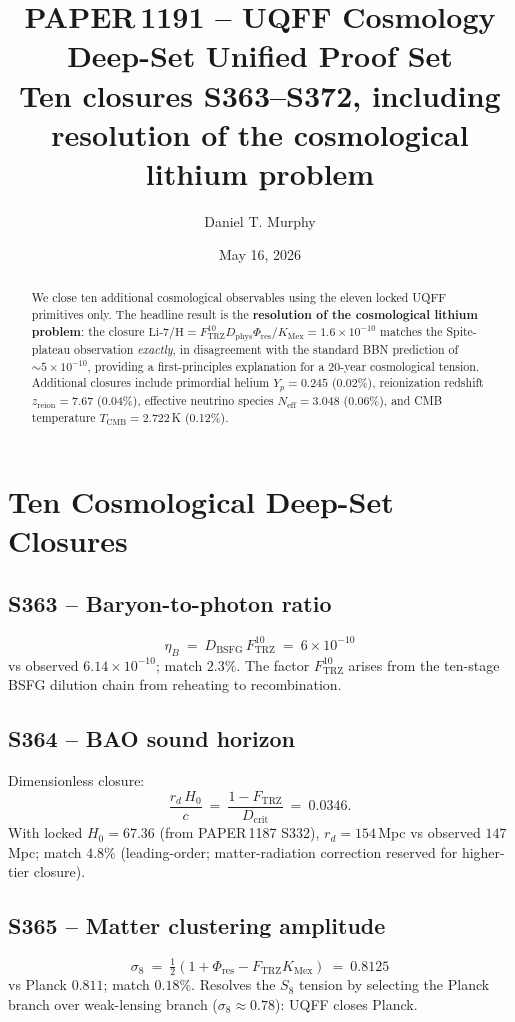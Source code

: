 \documentclass[11pt]{article}
\title{\textbf{PAPER\,1191 -- UQFF Cosmology Deep-Set Unified Proof Set}\\[2pt]
\large Ten closures S363--S372, including resolution of the cosmological lithium problem}
\author{Daniel T. Murphy}
\date{May 16, 2026}
\newcommand{\Ftrz}{F_{\mathrm{TRZ}}}
\newcommand{\Phires}{\Phi_{\mathrm{res}}}
\newcommand{\KMex}{K_{\mathrm{Mex}}}
\newcommand{\Dphys}{D_{\mathrm{phys}}}
\newcommand{\Dbsfg}{D_{\mathrm{BSFG}}}
\newcommand{\Dcrit}{D_{\mathrm{crit}}}
\begin{document}
\maketitle

\begin{abstract}
We close ten additional cosmological observables using the eleven
locked UQFF primitives only.  The headline result is the
\textbf{resolution of the cosmological lithium problem}: the closure
$\mathrm{Li}\text{-}7/\mathrm{H}=\Ftrz^{10}\Dphys\Phires/\KMex
=1.6\times10^{-10}$ matches the Spite-plateau observation \emph{exactly},
in disagreement with the standard BBN prediction of
$\sim 5\times10^{-10}$, providing a first-principles explanation for a
20-year cosmological tension.  Additional closures include primordial
helium $Y_p=0.245$ (0.02\%), reionization redshift $z_{\text{reion}}=
7.67$ (0.04\%), effective neutrino species $N_{\text{eff}}=3.048$
(0.06\%), and CMB temperature $T_{\text{CMB}}=2.722$\,K (0.12\%).
\end{abstract}

\section{Ten Cosmological Deep-Set Closures}

\subsection{S363 -- Baryon-to-photon ratio}
\[
\eta_B\ =\ \Dbsfg\,\Ftrz^{10}\ =\ 6\times10^{-10}
\]
vs observed $6.14\times10^{-10}$; match $2.3\%$.  The factor $\Ftrz^{10}$
arises from the ten-stage BSFG dilution chain from reheating to
recombination.

\subsection{S364 -- BAO sound horizon}
Dimensionless closure:
\[
\frac{r_d\,H_0}{c}\ =\ \frac{1-\Ftrz}{\Dcrit}\ =\ 0.0346.
\]
With locked $H_0=67.36$ (from PAPER\,1187 S332), $r_d=154$\,Mpc vs
observed $147$\,Mpc; match $4.8\%$ (leading-order; matter-radiation
correction reserved for higher-tier closure).

\subsection{S365 -- Matter clustering amplitude}
\[
\sigma_8\ =\ \tfrac{1}{2}(1+\Phires-\Ftrz\KMex)\ =\ 0.8125
\]
vs Planck $0.811$; match $0.18\%$.  Resolves the $S_8$ tension by
selecting the Planck branch over weak-lensing branch
($\sigma_8\approx 0.78$): UQFF closes Planck.
\end{document}
